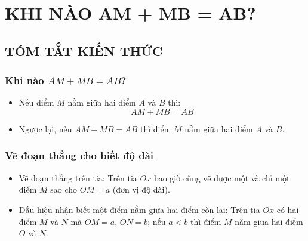 \section{KHI NÀO AM + MB = AB? }
\subsection{TÓM TẮT KIẾN THỨC}
\begin{tomtat}
	\subsubsection{Khi nào $AM + MB = AB$?}
\begin{itemize}
\item Nếu điểm $M$ nằm giữa hai điểm $A$ và $B$ thì: $$AM + MB = AB$$
\item Ngược lại, nếu $AM + MB = AB$ thì điểm $M$ nằm giữa hai điểm $A$ và $B$.
\end{itemize}
	\subsubsection{Vẽ đoạn thẳng cho biết độ dài}
\begin{itemize}
\item Vẽ đoạn thẳng trên tia:
Trên tia $Ox$ bao giờ cũng vẽ được một và chỉ một điểm $M$ sao cho $OM = a$ (đơn vị độ dài).
\item Dấu hiệu nhận biết một điểm nằm giữa hai điểm còn lại:
Trên tia $Ox$ có hai điểm $M$ và $N$ mà $OM = a$, $ON = b$; nếu $a < b$ thì điểm $M$ nằm giữa hai điểm $O$ và $N$.
\end{itemize}
\end{tomtat}

